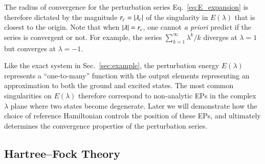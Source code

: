 \documentclass[aps,prb,reprint,noshowkeys,superscriptaddress]{revtex4-1}
\begin{document}
The radius of convergence for the perturbation series Eq.~\eqref{eq:E_expansion} is therefore dictated by the magnitude $r_c = \abs{\lambda_c}$ of the
singularity in $E(\lambda)$ that is closest to the origin.
Note that when $\abs{\lambda} = r_c$, one cannot \textit{a priori} predict if the series is convergent or not.
For example, the series $\sum_{k=1}^\infty \lambda^k/k$ diverges at $\lambda = 1$ but converges at $\lambda = -1$.

Like the exact system in Sec.~\ref{sec:example}, the perturbation energy $E(\lambda)$ represents
a ``one-to-many'' function with the output elements representing an approximation to both the ground and excited states.
The most common singularities on $E(\lambda)$ therefore correspond to non-analytic EPs in the complex 
$\lambda$ plane where two states become degenerate.
Later we will demonstrate how the choice of reference Hamiltonian controls the position of these EPs, and 
ultimately determines the convergence properties of the perturbation series.

\subsection{Hartree--Fock Theory}
\label{sec:HF}
\end{document}
